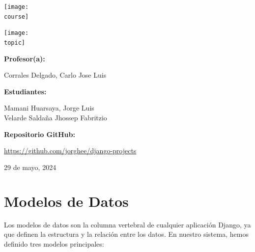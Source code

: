 \documentclass[10pt, a4paper]{article}
\newcommand{\course}{img/web_programming.png}
\newcommand{\topic}{img/django.png}
\newcommand{\professor}{Corrales Delgado, Carlo Jose Luis}
\newcommand{\students}{Mamani Huarsaya, Jorge Luis\\Velarde Saldaña Jhossep Fabritzio}
\newcommand{\github}{https://github.com/jorghee/django-projects}
\newcommand{\mydate}{29 de mayo, 2024}
\begin{document}
\begin{titlepage}
	\centering
	\texttt{[image: \\course]} \par
  \vfill \vfill
	\texttt{[image: \\topic]}\par
  \vfill \vfill
  {\textbf{Profesor(a):} \par}
	\professor \vfill
  {\textbf{Estudiantes:} \par}
	\students \vfill
  {\textbf{Repositorio GitHub:} \par}
  \href{\github}{\github} \vfill
	{\large \mydate \par}
\end{titlepage}

\section{Modelos de Datos}
Los modelos de datos son la columna vertebral de cualquier aplicación Django, ya que definen la estructura y la relación entre los datos. En nuestro sistema, hemos definido tres modelos principales:
\end{document}
